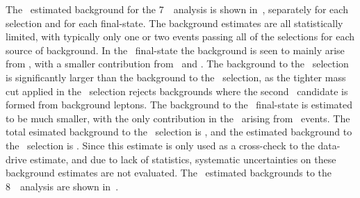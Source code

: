 The \mc\ estimated background for the 7~\tev\ analysis is shown
in~, separately for each selection and for each final-state. The
background estimates are all statistically limited, with typically only one or
two events passing all of the selections for each source of background. In the \eeee\ final-state the
background is seen to mainly arise from \Zjets, with a smaller contribution from
\WZ\ and \WW. The background to the \ZZs\ selection is significantly larger than
the background to the \ZZ\ selection, as the tighter mass cut applied in the
\ZZ\ selection rejects backgrounds where the second \Z\ candidate is formed from
background leptons. The background to the \mmmm\ final-state is estimated to be much smaller, with the only contribution in the \mc\ arising
from \WZ\ events. The total esimated background to the \ZZs\ selection is
, and the estimated background to the \ZZ\ selection
is . Since this estimate is only used as a
cross-check to the data-drive estimate, and due to lack of statistics,
systematic uncertainties on these background estimates are not evaluated.
The \mc\ estimated backgrounds to the 8~\tev\ analysis are shown
in~. 

